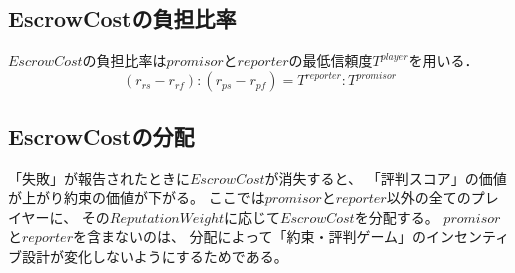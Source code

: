 \subsection{EscrowCostの負担比率}
$ EscrowCost $の負担比率は$ promisor $と$ reporter $の最低信頼度$ T^{player} $を用いる．\\

\begin{equation}
  (r_{rs} - r_{rf}):(r_{ps} - r_{pf}) = T^{reporter}:T^{promisor}
\end{equation}

\subsection{EscrowCostの分配}
「失敗」が報告されたときに$ EscrowCost $が消失すると、
「評判スコア」の価値が上がり約束の価値が下がる。
ここでは$promisor$と$reporter$以外の全てのプレイヤーに、
その$ReputationWeight$に応じて$EscrowCost$を分配する。
$promisor$と$reporter$を含まないのは、
分配によって「約束・評判ゲーム」のインセンティブ設計が変化しないようにするためである。







